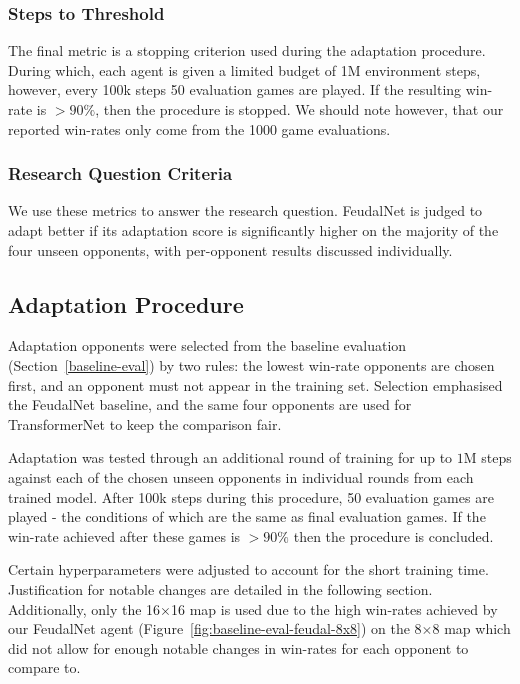 \documentclass[sigconf,review=false]{acmart}
\begin{document}
\subsubsection{Steps to Threshold}

The final metric is a stopping criterion used during the adaptation procedure.
During which, each agent is given a limited budget of 1M environment steps, however, every 100k steps 50 evaluation games are played.
If the resulting win-rate is $>90\%$, then the procedure is stopped.
We should note however, that our reported win-rates only come from the 1000 game evaluations.

\subsubsection{Research Question Criteria}
We use these metrics to answer the research question.
FeudalNet is judged to adapt better if its adaptation score is significantly higher on the majority of the four unseen opponents, with per-opponent results discussed individually.


\subsection{Adaptation Procedure}
\label{adaptation-selection}
Adaptation opponents were selected from the baseline evaluation (Section~\ref{baseline-eval}) by two rules: the lowest win-rate opponents are chosen first, and an opponent must not appear in the training set. 
Selection emphasised the FeudalNet baseline, and the same four opponents are used for TransformerNet to keep the comparison fair.

Adaptation was tested through an additional round of training for up to $1\text{M}$ steps against each of the chosen unseen opponents in individual rounds from each trained model.
After 100k steps during this procedure, 50 evaluation games are played - the conditions of which are the same as final evaluation games.
If the win-rate achieved after these games is $>90\%$ then the procedure is concluded.

Certain hyperparameters were adjusted to account for the short training time.
Justification for notable changes are detailed in the following section.
Additionally, only the 16$\times$16 map is used due to the high win-rates achieved by our FeudalNet agent (Figure~\ref{fig:baseline-eval-feudal-8x8}) on the 8$\times$8 map which did not allow for enough notable changes in win-rates for each opponent to compare to.
\end{document}
